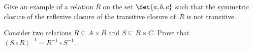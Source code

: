 \documentclass[a4paper,12pt]{article}
\begin{document}
\begin{tasks}
    \item Give an example of a relation $R$ on the set $\Set{a, b, c}$ such that the symmetric closure of the reflexive closure of the
    transitive closure of~$R$ is not transitive.








    \item Consider two relations $R \subseteq A \times B$ and $S \subseteq B \times C$.
    Prove that $(S \circ R)^{-1} = R^{-1} \circ S^{-1}$.



\end{tasks}
\end{document}
